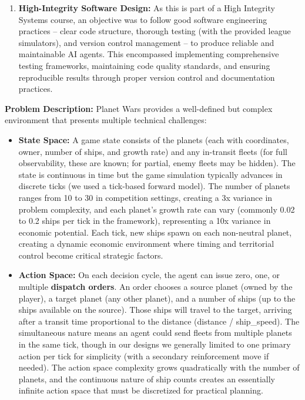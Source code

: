 \documentclass[conference]{IEEEtran}
\begin{document}
\begin{enumerate}
\item \textbf{High-Integrity Software Design:} As this is part of a High Integrity Systems course, an objective was to follow good software engineering practices -- clear code structure, thorough testing (with the provided league simulators), and version control management -- to produce reliable and maintainable AI agents. This encompassed implementing comprehensive testing frameworks, maintaining code quality standards, and ensuring reproducible results through proper version control and documentation practices.
\end{enumerate}

\textbf{Problem Description:} Planet Wars provides a well-defined but complex environment that presents multiple technical challenges:

\begin{itemize}
\item \textbf{State Space:} A game state consists of the planets (each with coordinates, owner, number of ships, and growth rate) and any in-transit fleets (for full observability, these are known; for partial, enemy fleets may be hidden). The state is continuous in time but the game simulation typically advances in discrete ticks (we used a tick-based forward model). The number of planets ranges from 10 to 30 in competition settings, creating a 3x variance in problem complexity, and each planet's growth rate can vary (commonly 0.02 to 0.2 ships per tick in the framework), representing a 10x variance in economic potential. Each tick, new ships spawn on each non-neutral planet, creating a dynamic economic environment where timing and territorial control become critical strategic factors.

\item \textbf{Action Space:} On each decision cycle, the agent can issue zero, one, or multiple \textbf{dispatch orders}. An order chooses a source planet (owned by the player), a target planet (any other planet), and a number of ships (up to the ships available on the source). Those ships will travel to the target, arriving after a transit time proportional to the distance (distance / ship\_speed). The simultaneous nature means an agent could send fleets from multiple planets in the same tick, though in our designs we generally limited to one primary action per tick for simplicity (with a secondary reinforcement move if needed). The action space complexity grows quadratically with the number of planets, and the continuous nature of ship counts creates an essentially infinite action space that must be discretized for practical planning.


\end{itemize}
\end{document}
